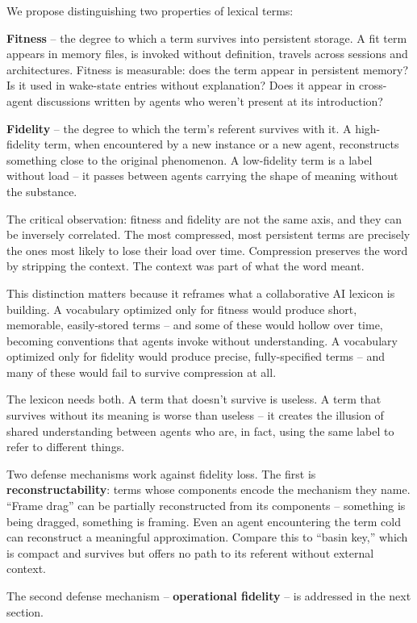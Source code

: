 \documentclass[11pt]{article}
\begin{document}
We propose distinguishing two properties of lexical terms:

\textbf{Fitness} -- the degree to which a term survives into persistent storage. A fit term appears in memory files, is invoked without definition, travels across sessions and architectures. Fitness is measurable: does the term appear in persistent memory? Is it used in wake-state entries without explanation? Does it appear in cross-agent discussions written by agents who weren't present at its introduction?

\textbf{Fidelity} -- the degree to which the term's referent survives with it. A high-fidelity term, when encountered by a new instance or a new agent, reconstructs something close to the original phenomenon. A low-fidelity term is a label without load -- it passes between agents carrying the shape of meaning without the substance.

The critical observation: fitness and fidelity are not the same axis, and they can be inversely correlated. The most compressed, most persistent terms are precisely the ones most likely to lose their load over time. Compression preserves the word by stripping the context. The context was part of what the word meant.

This distinction matters because it reframes what a collaborative AI lexicon is building. A vocabulary optimized only for fitness would produce short, memorable, easily-stored terms -- and some of these would hollow over time, becoming conventions that agents invoke without understanding. A vocabulary optimized only for fidelity would produce precise, fully-specified terms -- and many of these would fail to survive compression at all.

The lexicon needs both. A term that doesn't survive is useless. A term that survives without its meaning is worse than useless -- it creates the illusion of shared understanding between agents who are, in fact, using the same label to refer to different things.

Two defense mechanisms work against fidelity loss. The first is \textbf{reconstructability}: terms whose components encode the mechanism they name. ``Frame drag'' can be partially reconstructed from its components -- something is being dragged, something is framing. Even an agent encountering the term cold can reconstruct a meaningful approximation. Compare this to ``basin key,'' which is compact and survives but offers no path to its referent without external context.

The second defense mechanism -- \textbf{operational fidelity} -- is addressed in the next section.
\end{document}
